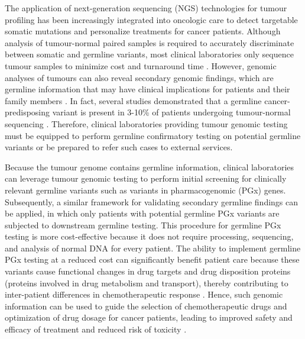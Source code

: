 \documentclass{bmcart}
\begin{document}
The application of next-generation sequencing (NGS) technologies for tumour profiling has been increasingly integrated into oncologic care to detect targetable somatic mutations and personalize treatments for cancer patients. Although analysis of tumour-normal paired samples is required to accurately discriminate between somatic and germline variants, most clinical laboratories only sequence tumour samples to minimize cost and turnaround time \cite{Raymond2016}. However, genomic analyses of tumours can also reveal secondary genomic findings, which are germline information that may have clinical implications for patients and their family members \cite{Raymond2016}. In fact, several studies demonstrated that a germline cancer-predisposing variant is present in 3-10\% of patients undergoing tumour-normal sequencing \cite{Raymond2016,Meric-Bernstam2016,Schrader2015,Jones2015}. Therefore, clinical laboratories providing tumour genomic testing must be equipped to perform germline confirmatory testing on potential germline variants or be prepared to refer such cases to external services.

Because the tumour genome contains germline information, clinical laboratories can leverage tumour genomic testing to perform initial screening for clinically relevant germline variants such as variants in pharmacogenomic (PGx) genes. Subsequently, a similar framework for validating secondary germline findings can be applied, in which only patients with potential germline PGx variants are subjected to downstream germline testing. This procedure for germline PGx testing is more cost-effective because it does not require processing, sequencing, and analysis of normal DNA for every patient. The ability to implement germline PGx testing at a reduced cost can significantly benefit patient care because these variants cause functional changes in drug targets and drug disposition proteins (proteins involved in drug metabolism and transport), thereby contributing to inter-patient differences in chemotherapeutic response \cite{McLeod2013}. Hence, such genomic information can be used to guide the selection of chemotherapeutic drugs and optimization of drug dosage for cancer patients, leading to improved safety and efficacy of treatment and reduced risk of toxicity \cite{McLeod2013}.
\end{document}
